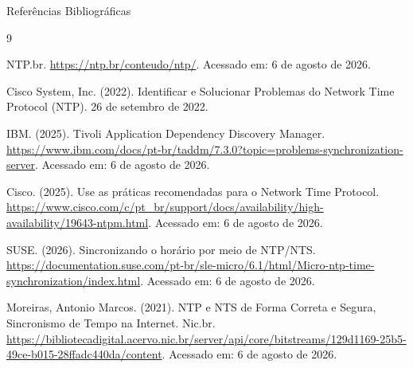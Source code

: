\documentclass{if-beamer}
\begin{document}
	\begin{frame}[allowframebreaks]{Referências Bibliográficas}
		\begin{thebibliography}{9}

NTP.br. \url{https://ntp.br/conteudo/ntp/}. Acessado em: 6 de agosto de 2026.

Cisco System, Inc. (2022). Identificar e Solucionar Problemas do Network Time Protocol (NTP). 26 de setembro de 2022.

IBM. (2025). Tivoli Application Dependency Discovery Manager. \url{https://www.ibm.com/docs/pt-br/taddm/7.3.0?topic=problems-synchronization-server}. Acessado em: 6 de agosto de 2026.

Cisco. (2025). Use as práticas recomendadas para o Network Time Protocol. \url{https://www.cisco.com/c/pt_br/support/docs/availability/high-availability/19643-ntpm.html}. Acessado em: 6 de agosto de 2026.

SUSE. (2026). Sincronizando o horário por meio de NTP/NTS. \url{https://documentation.suse.com/pt-br/sle-micro/6.1/html/Micro-ntp-time-synchronization/index.html}. Acessado em: 6 de agosto de 2026.

Moreiras, Antonio Marcos. (2021). NTP e NTS de Forma Correta e Segura, Sincronismo de Tempo na Internet. Nic.br. \url{https://bibliotecadigital.acervo.nic.br/server/api/core/bitstreams/129d1169-25b5-49ce-b015-28ffadc440da/content}. Acessado em: 6 de agosto de 2026.
\end{thebibliography}
	\end{frame}	
	
\end{document}

